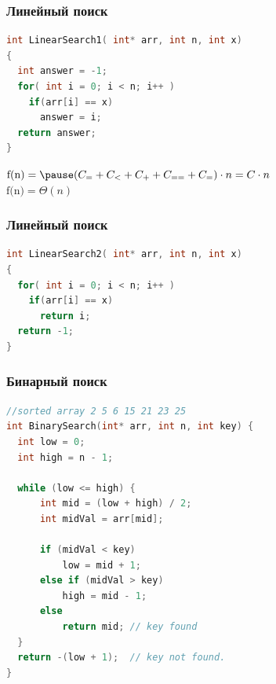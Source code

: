 \documentclass[russian, 12pt]{beamer}
\begin{document}
\lstset{style=mystyle}
\begin{frame}[fragile]
\frametitle{Линейный поиск}
\begin{lstlisting}[language=C++]
int LinearSearch1( int* arr, int n, int x)
{
  int answer = -1;
  for( int i = 0; i < n; i++ )
    if(arr[i] == x)
      answer = i;
  return answer;
}
\end{lstlisting}
$\text{f(n)} = \pause(C_{=} + C_{<} + C_{+} + C_{==} + C_{=} ) \cdot n 
= C \cdot n$\\[0.3cm] \pause
$\boxed{\text{f(n)} = \Theta (n)}$
\end{frame}
\lstset{style=mystyle}
\begin{frame}[fragile]
\frametitle{Линейный поиск}
\begin{lstlisting}[language=C++]
int LinearSearch2( int* arr, int n, int x)
{
  for( int i = 0; i < n; i++ )
    if(arr[i] == x)
      return i;
  return -1;
}
\end{lstlisting}
\end{frame}
\lstset{style=mystyle}
\begin{frame}[fragile]
\frametitle{Бинарный поиск}
\begin{lstlisting}[language=C++]
//sorted array 2 5 6 15 21 23 25
int BinarySearch(int* arr, int n, int key) {
  int low = 0;
  int high = n - 1;

  while (low <= high) {
      int mid = (low + high) / 2;
      int midVal = arr[mid];

      if (midVal < key)
          low = mid + 1;
      else if (midVal > key)
          high = mid - 1;
      else
          return mid; // key found
  }
  return -(low + 1);  // key not found.
}
\end{lstlisting}
\end{frame}
\end{document}
